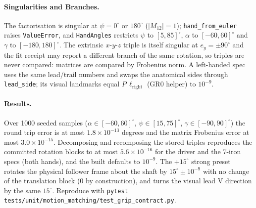 \documentclass[11pt,a4paper]{article}
\begin{document}
\paragraph{Singularities and Branches.}
The factorisation is singular at $\psi=0^\circ$ or $180^\circ$
($|M_{12}|=1$); \texttt{hand\_from\_euler} raises \texttt{ValueError}, and
\texttt{HandAngles} restricts $\psi$ to $[5,85]^\circ$, $\alpha$ to
$[-60,60]^\circ$ and $\gamma$ to $[-180,180]^\circ$. The extrinsic $x$-$y$-$z$
triple is itself singular at $e_y=\pm90^\circ$ and the fit receipt may report
a different branch of the same rotation, so triples are never compared:
matrices are compared by Frobenius norm. A left-handed spec uses the same
lead/trail numbers and swaps the anatomical sides through
\texttt{lead\_side}; its visual landmarks equal $P\,\ell_{\mathrm{right}}$
(GR0 helper) to $10^{-9}$.

\paragraph{Results.}
Over 1000 seeded samples ($\alpha\in[-60,60]^\circ$, $\psi\in[15,75]^\circ$,
$\gamma\in[-90,90]^\circ$) the round trip error is at most
$1.8\times10^{-13}$ degrees and the matrix Frobenius error at most
$3.0\times10^{-15}$. Decomposing and recomposing the stored triples
reproduces the committed rotation blocks to at most $5.6\times10^{-16}$ for
the driver and the 7-iron specs (both hands), and the built defaults to
$10^{-9}$. The $+15^\circ$ strong preset rotates the physical follower frame
about the shaft by $15^\circ\pm10^{-9}$ with no change of the translation block
(0 by construction), and turns the visual lead V direction by the same
$15^\circ$. Reproduce with
\texttt{pytest tests/unit/motion\_matching/test\_grip\_contract.py}.
\end{document}
